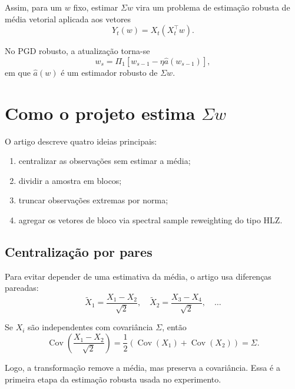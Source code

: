 \documentclass[12pt,a4paper]{article}
\newcommand{\Cov}{\operatorname{Cov}}
\begin{document}
Assim, para um $w$ fixo, estimar $\Sigma w$ vira um problema de estimação robusta de média
vetorial aplicada aos vetores
\begin{equation}
  Y_t(w) = X_t(X_t^\top w).
\end{equation}

No PGD robusto, a atualização torna-se
\begin{equation}
  w_s
  =
  \Pi_1\left[
    w_{s-1} - \eta \widehat a(w_{s-1})
  \right],
  \label{eq:robust_pgd}
\end{equation}
em que $\widehat a(w)$ é um estimador robusto de $\Sigma w$.

\section{\texorpdfstring{Como o projeto estima $\Sigma w$}{Como o projeto estima Sigma w}}

O artigo descreve quatro ideias principais:

\begin{enumerate}[leftmargin=*]
  \item centralizar as observações sem estimar a média;
  \item dividir a amostra em blocos;
  \item truncar observações extremas por norma;
  \item agregar os vetores de bloco via spectral sample reweighting do tipo HLZ.
\end{enumerate}

\subsection{Centralização por pares}

Para evitar depender de uma estimativa da média, o artigo usa diferenças pareadas:
\begin{equation}
  \widetilde X_1 = \frac{X_1-X_2}{\sqrt{2}},
  \quad
  \widetilde X_2 = \frac{X_3-X_4}{\sqrt{2}},
  \quad \dots
\end{equation}

Se $X_i$ são independentes com covariância $\Sigma$, então
\begin{equation}
  \Cov\left(\frac{X_1-X_2}{\sqrt{2}}\right)
  =
  \frac{1}{2}\left(\Cov(X_1)+\Cov(X_2)\right)
  =
  \Sigma.
\end{equation}

Logo, a transformação remove a média, mas preserva a covariância. Essa é a primeira etapa da
estimação robusta usada no experimento.
\end{document}
